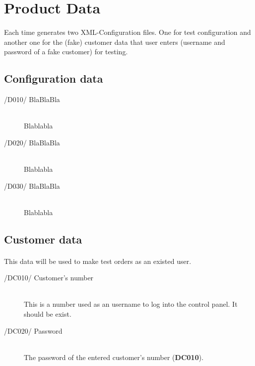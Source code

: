\section{Product Data}
\paragraph{}Each time \app{} generates two XML-Configuration files. One for test configuration and another one for the (fake) customer data that user enters (username and password of a fake customer) for testing.

\subsection{Configuration data}
\begin{description}
\item[/D010/ BlaBlaBla]\hfill \\ Blablabla
\item[/D020/ BlaBlaBla]\hfill \\ Blablabla
\item[/D030/ BlaBlaBla]\hfill \\ Blablabla
\end{description}

\subsection{Customer data}
\paragraph{}This data will be used to make test orders as an existed user.
\begin{description}
\item[/DC010/ Customer's number]\hfill\\ This is a number used as an username to log into the control panel. It should be exist.
\item[/DC020/ Password]\hfill\\ The password of the entered customer's number (\textbf{DC010}).
\end{description}
